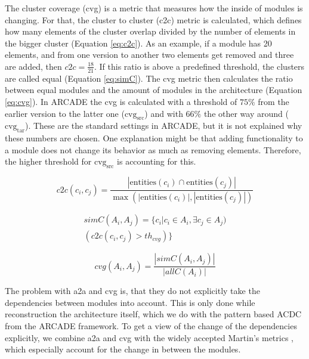 \documentclass[conference]{IEEEtran}
\begin{document}
The cluster coverage (cvg) is a metric that measures how the inside of modules is changing. For that, the cluster to cluster (c2c) metric is calculated, which defines how many elements of the cluster overlap divided by the number of elements in the bigger cluster (Equation \ref{eq:c2c}). 
As an example, if a module has 20 elements, and from one version to another two elements get removed and three are added, then $c2c = \frac{18}{21}$. 
If this ratio is above a predefined threshold, the clusters are called equal (Equation \ref{eq:simC}). The cvg metric then calculates the ratio between equal modules and the amount of modules in the architecture (Equation \ref{eq:cvg}). In ARCADE the cvg is calculated with a threshold of $75\%$ from the earlier version to the latter one ($\text{cvg}_\text{src}$) and with $66\%$ the other way around ($\text{cvg}_\text{tar}$). These are the standard settings in ARCADE, but it is not explained why these numbers are chosen. One explanation might be that adding functionality to a module does not change its behavior as much as removing elements. Therefore, the higher threshold for $\text{cvg}_\text{src}$ is accounting for this.

\begin{equation} \label{eq:c2c}
c2c(c_i, c_j) = \frac{|\text{entities}(c_i) \cap \text{entities}(c_j)|}{\max(|\text{entities}(c_i)|, |\text{entities}(c_j)|)}
\end{equation}

\begin{equation} \label{eq:simC}
\begin{split}
simC(A_i, A_j) = \{c_i | c_i \in A_i, \exists c_j \in A_j) \\ 
(c2c(c_i, c_j) > th_{cvg})\}
\end{split}
\end{equation}

\begin{equation} \label{eq:cvg}
cvg(A_i, A_j) = \frac{|simC(A_i, A_j)|}{|allC(A_i)|}
\end{equation}

The problem with a2a and cvg is, that they do not explicitly take the dependencies between modules into account. This is only done while reconstruction the architecture itself, which we do with the pattern based ACDC from the ARCADE framework. 
To get a view of the change of the dependencies explicitly, we combine a2a and cvg with the widely accepted Martin's metrics \cite{Val-MartinsMet}, which especially account for the change in between the modules. 
\end{document}
